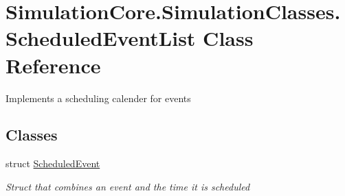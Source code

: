 \hypertarget{class_simulation_core_1_1_simulation_classes_1_1_scheduled_event_list}{}\section{Simulation\+Core.\+Simulation\+Classes.\+Scheduled\+Event\+List Class Reference}
\label{class_simulation_core_1_1_simulation_classes_1_1_scheduled_event_list}


Implements a scheduling calender for events  


\subsection*{Classes}
\begin{DoxyCompactItemize}
\item 
struct \hyperlink{struct_simulation_core_1_1_simulation_classes_1_1_scheduled_event_list_1_1_scheduled_event}{Scheduled\+Event}
\begin{DoxyCompactList}\small\item\em Struct that combines an event and the time it is scheduled \end{DoxyCompactList}\end{DoxyCompactItemize}
